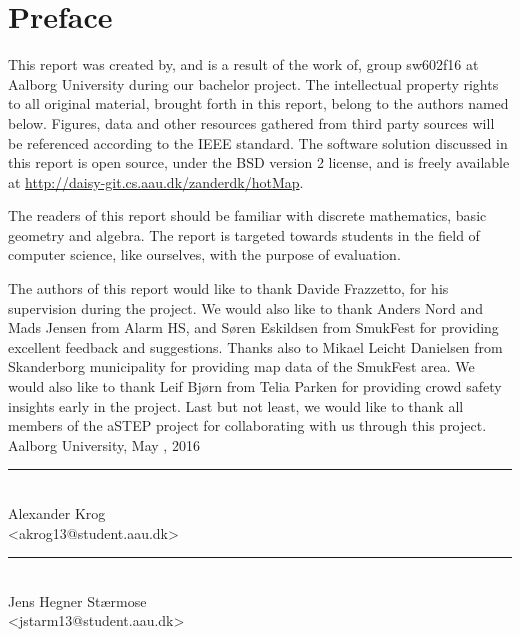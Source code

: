 \chapter*{Preface}\label{ch:preface}
This report was created by, and is a result of the work of, group sw602f16 at Aalborg University during our bachelor project. The intellectual property rights to all original material, brought forth in this report, belong to the authors named below. Figures, data and other resources gathered from third party sources will be referenced according to the IEEE standard. The software solution discussed in this report is open source, under the BSD version 2 license, and is freely available at \url{http://daisy-git.cs.aau.dk/zanderdk/hotMap}.

The readers of this report should be familiar with discrete mathematics, basic geometry and algebra. The report is targeted towards students in the field of computer science, like ourselves, with the purpose of evaluation.

The authors of this report would like to thank Davide Frazzetto, for his supervision during the project. We would also like to thank Anders Nord and Mads Jensen from Alarm HS, and Søren Eskildsen from SmukFest for providing excellent feedback and suggestions. Thanks also to Mikael Leicht Danielsen from Skanderborg municipality for providing map data of the SmukFest area. We would also like to thank Leif Bjørn from Telia Parken for providing crowd safety insights early in the project. Last but not least, we would like to thank all members of the aSTEP project for collaborating with us through this project.
\vspace{\baselineskip}\hfill Aalborg University, May , 2016
\vfill

\noindent
\begin{minipage}[b]{0.45\textwidth}
 \centering
 \rule{\textwidth}{0.5pt}\\
  Alexander Krog\\
 {\footnotesize <akrog13@student.aau.dk>}
\end{minipage}
%
\hfill
%
\begin{minipage}[b]{0.45\textwidth}
 \centering
 \rule{\textwidth}{0.5pt}\\
  Jens Hegner Stærmose\\
 {\footnotesize <jstarm13@student.aau.dk>}
\end{minipage}
%
\vspace{3\baselineskip}

